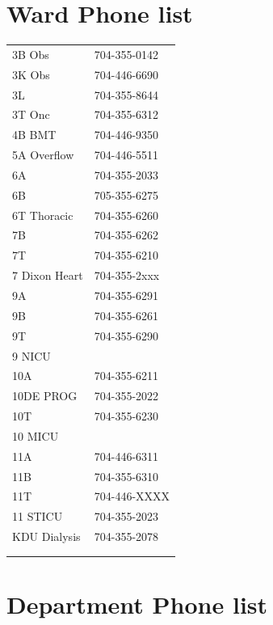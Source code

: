 \documentclass[
  letterpaper,
]{scrbook}
\begin{document}
\chapter{Ward Phone list}\label{ward-phone-list}

\begin{longtable}[]{@{}ll@{}}
\toprule\noalign{}
\endhead
\bottomrule\noalign{}
\endlastfoot
3B Obs & 704-355-0142 \\
3K Obs & 704-446-6690 \\
3L & 704-355-8644 \\
3T Onc & 704-355-6312 \\
4B BMT & 704-446-9350 \\
5A Overflow & 704-446-5511 \\
6A & 704-355-2033 \\
6B & 705-355-6275 \\
6T Thoracic & 704-355-6260 \\
7B & 704-355-6262 \\
7T & 704-355-6210 \\
7 Dixon Heart & 704-355-2xxx \\
9A & 704-355-6291 \\
9B & 704-355-6261 \\
9T & 704-355-6290 \\
9 NICU & \\
10A & 704-355-6211 \\
10DE PROG & 704-355-2022 \\
10T & 704-355-6230 \\
10 MICU & \\
11A & 704-446-6311 \\
11B & 704-355-6310 \\
11T & 704-446-XXXX \\
11 STICU & 704-355-2023 \\
KDU Dialysis & 704-355-2078 \\
& \\
& \\
\end{longtable}

\chapter{Department Phone list}\label{department-phone-list}
\end{document}
